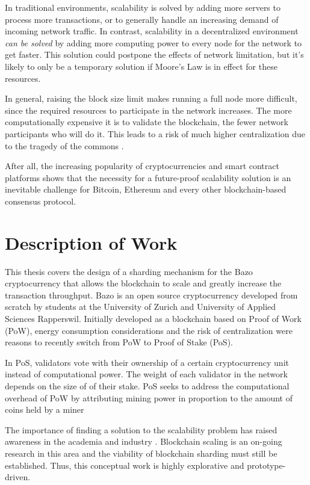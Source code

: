 In traditional environments, scalability is solved by adding more servers to process more transactions, or to generally handle an increasing demand of incoming network traffic. In contrast, scalability in a decentralized environment \textit{can be solved} by adding more computing power to every node for the network to get faster. This solution could postpone the effects of network limitation, but it's likely to only be a temporary solution if Moore's Law \parencite{Moore:2000:CMC:333067.333074} is in effect for these resources.

In general, raising the block size limit makes running a full node more difficult, since the required resources to participate in the network increases. The more computationally expensive it is to validate the blockchain, the fewer network participants who will do it. This leads to a risk of much higher centralization due to the tragedy of the commons \parencite{Garret68}.

After all, the increasing popularity of cryptocurrencies and smart contract platforms shows that the necessity for a future-proof scalability solution is an inevitable challenge for Bitcoin, Ethereum and every other blockchain-based consensus protocol. 

\section{Description of Work}

This thesis covers the design of a sharding mechanism for the Bazo cryptocurrency that allows the blockchain to scale and greatly increase the transaction throughput. Bazo \parencites{Sgier17, Bachmann18} is an open source cryptocurrency developed from scratch by students at the University of Zurich and University of Applied Sciences Rapperswil. Initially developed as a blockchain based on Proof of Work (PoW), energy consumption considerations and the risk of centralization were reasons to recently switch from PoW to Proof of Stake (PoS). 

In PoS, validators vote with their ownership of a certain cryptocurrency unit instead of computational power. The weight of each validator in the network depends on the size of of their stake. PoS seeks to address the computational overhead of PoW by attributing mining power in proportion to the amount of coins held by a miner

The importance of finding a solution to the scalability problem has raised awareness in the academia and industry \parencites{BitcoinNG16, Zilliqa18, OmniLedger18}. Blockchain scaling is an on-going research in this area and the viability of blockchain sharding must still be established. Thus, this conceptual work is highly explorative and prototype-driven.

